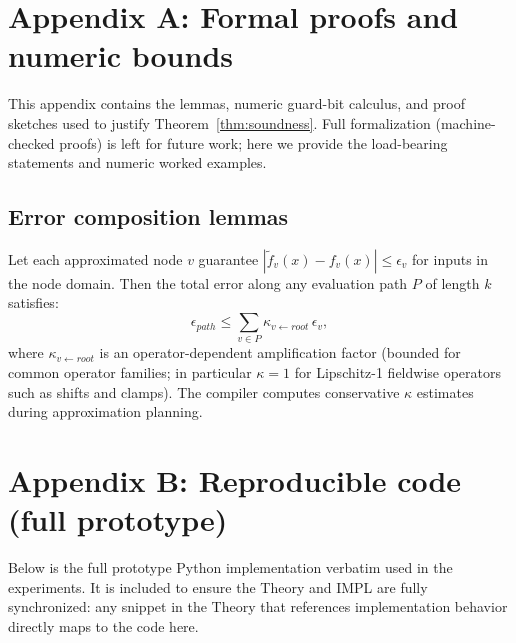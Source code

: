 \documentclass[11pt]{article}
\theoremstyle{definition}
\theoremstyle{plain}
\begin{document}
\appendix

\section{Appendix A: Formal proofs and numeric bounds}\label{app:proofs}
This appendix contains the lemmas, numeric guard-bit calculus, and proof sketches used to justify Theorem~\ref{thm:soundness}. Full formalization (machine-checked proofs) is left for future work; here we provide the load-bearing statements and numeric worked examples.

\subsection{Error composition lemmas}\label{sec:errors}
Let each approximated node \(v\) guarantee \(|\tilde{f}_v(x)-f_v(x)|\le \epsilon_v\) for inputs in the node domain. Then the total error along any evaluation path \(P\) of length \(k\) satisfies:
\[
\epsilon_{path} \le \sum_{v\in P} \kappa_{v\leftarrow root}\,\epsilon_v,
\]
where \(\kappa_{v\leftarrow root}\) is an operator-dependent amplification factor (bounded for common operator families; in particular \(\kappa=1\) for Lipschitz-1 fieldwise operators such as shifts and clamps). The compiler computes conservative \(\kappa\) estimates during approximation planning.

\section{Appendix B: Reproducible code (full prototype)}\label{app:impl}
Below is the full prototype Python implementation verbatim used in the experiments. It is included to ensure the Theory and IMPL are fully synchronized: any snippet in the Theory that references implementation behavior directly maps to the code here.

\end{document}
